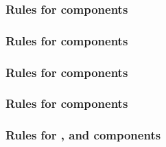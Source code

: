 \begin{sbmlenum}
\end{sbmlenum} \subsubsection*{Rules for  components} \begin{sbmlenum}


\end{sbmlenum} \subsubsection*{Rules for  components} \begin{sbmlenum}


\end{sbmlenum} \subsubsection*{Rules for  components} \begin{sbmlenum}


\end{sbmlenum} \subsubsection*{Rules for  components} \begin{sbmlenum}


\end{sbmlenum} \subsubsection*{Rules for ,  and  components} \begin{sbmlenum}


\end{sbmlenum}
